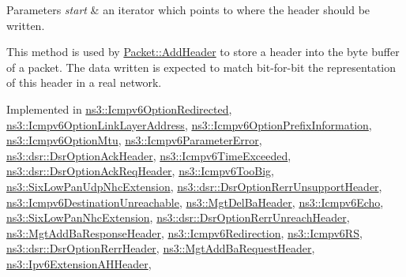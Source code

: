 \begin{DoxyParams}{Parameters}
{\em start} & an iterator which points to where the header should be written.\\
\hline
\end{DoxyParams}
This method is used by \hyperlink{classns3_1_1Packet_a465108c595a0bc592095cbcab1832ed8}{Packet\+::\+Add\+Header} to store a header into the byte buffer of a packet. The data written is expected to match bit-\/for-\/bit the representation of this header in a real network. 

Implemented in \hyperlink{classns3_1_1Icmpv6OptionRedirected_a9333a29cdc5f4b4f0807b44afb00b9e9}{ns3\+::\+Icmpv6\+Option\+Redirected}, \hyperlink{classns3_1_1Icmpv6OptionLinkLayerAddress_a472a16e3a3105e71bfb4d768d29fc0d8}{ns3\+::\+Icmpv6\+Option\+Link\+Layer\+Address}, \hyperlink{classns3_1_1Icmpv6OptionPrefixInformation_a4c498867c73398d9958aea86ff3ac4f7}{ns3\+::\+Icmpv6\+Option\+Prefix\+Information}, \hyperlink{classns3_1_1Icmpv6OptionMtu_a7fb0a0d983fc4ca0d906da376bd9bceb}{ns3\+::\+Icmpv6\+Option\+Mtu}, \hyperlink{classns3_1_1Icmpv6ParameterError_a72ba841a8b45117a67cfb9a89ffd677b}{ns3\+::\+Icmpv6\+Parameter\+Error}, \hyperlink{classns3_1_1dsr_1_1DsrOptionAckHeader_a0aeceebc3c3eb4f5241b4799b5eed36b}{ns3\+::dsr\+::\+Dsr\+Option\+Ack\+Header}, \hyperlink{classns3_1_1Icmpv6TimeExceeded_a8cc2085dcd82138138cdc2029280a60f}{ns3\+::\+Icmpv6\+Time\+Exceeded}, \hyperlink{classns3_1_1dsr_1_1DsrOptionAckReqHeader_ae743c5267313ec4423a92e3ed8e81c63}{ns3\+::dsr\+::\+Dsr\+Option\+Ack\+Req\+Header}, \hyperlink{classns3_1_1Icmpv6TooBig_ae8042b6593cfb81dad23e60c588e7b21}{ns3\+::\+Icmpv6\+Too\+Big}, \hyperlink{classns3_1_1SixLowPanUdpNhcExtension_a119c2e18b012b963aa6035cec1de920e}{ns3\+::\+Six\+Low\+Pan\+Udp\+Nhc\+Extension}, \hyperlink{classns3_1_1dsr_1_1DsrOptionRerrUnsupportHeader_a797b41d9c8fa55f825ac24dadb16fd7b}{ns3\+::dsr\+::\+Dsr\+Option\+Rerr\+Unsupport\+Header}, \hyperlink{classns3_1_1Icmpv6DestinationUnreachable_a97ea83de54f105a43a8386e2934fe732}{ns3\+::\+Icmpv6\+Destination\+Unreachable}, \hyperlink{classns3_1_1MgtDelBaHeader_a4686f89157445f923e3aab5849eb90ca}{ns3\+::\+Mgt\+Del\+Ba\+Header}, \hyperlink{classns3_1_1Icmpv6Echo_ae00908cfd1912f20da4ad804ce73ba1d}{ns3\+::\+Icmpv6\+Echo}, \hyperlink{classns3_1_1SixLowPanNhcExtension_a10fa0057db4347789cfe22f365ee0ba2}{ns3\+::\+Six\+Low\+Pan\+Nhc\+Extension}, \hyperlink{classns3_1_1dsr_1_1DsrOptionRerrUnreachHeader_aaf3feea2c11c1b363f4d4bc041a8f21c}{ns3\+::dsr\+::\+Dsr\+Option\+Rerr\+Unreach\+Header}, \hyperlink{classns3_1_1MgtAddBaResponseHeader_a64c18b13920615a98f0a4b15549d479d}{ns3\+::\+Mgt\+Add\+Ba\+Response\+Header}, \hyperlink{classns3_1_1Icmpv6Redirection_a3d278de1bcf39046510795bd78a4acfa}{ns3\+::\+Icmpv6\+Redirection}, \hyperlink{classns3_1_1Icmpv6RS_aa2e8d1a63701015e774a9a5d660dfde4}{ns3\+::\+Icmpv6\+RS}, \hyperlink{classns3_1_1dsr_1_1DsrOptionRerrHeader_a973a8c73444e9a2f4bd94292f716259c}{ns3\+::dsr\+::\+Dsr\+Option\+Rerr\+Header}, \hyperlink{classns3_1_1MgtAddBaRequestHeader_a01eb353911ddac60b43efd72001ae686}{ns3\+::\+Mgt\+Add\+Ba\+Request\+Header}, \hyperlink{classns3_1_1Ipv6ExtensionAHHeader_a903f2117b1810f9fdd66558517c0cf5c}{ns3\+::\+Ipv6\+Extension\+A\+H\+Header}, 